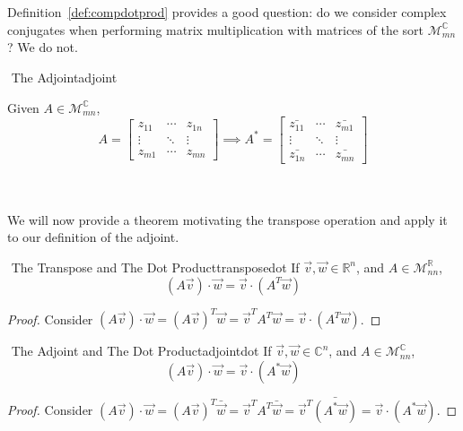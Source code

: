         \vphantom
        \\
        \\
        Definition~\ref{def:compdotprod} provides a good question: do we consider complex conjugates when performing matrix multiplication with matrices of the sort \(\mathcal{M}_{mn}^\mathbb{C}\)? We do not.
        \begin{definition}{\Stop\,\,The Adjoint}{adjoint}

            Given \(A\in\mathcal{M}_{mn}^\mathbb{C}\), 
            \begin{equation*}
                A=\begin{bmatrix}
                    z_{11} & \cdots & z_{1n} \\
                    \vdots & \ddots & \vdots \\
                    z_{m1} & \cdots & z_{mn}
                \end{bmatrix}
                \implies 
                A^*=\begin{bmatrix}
                    \bar{z_{11}} & \cdots & \bar{z_{m1}} \\
                    \vdots & \ddots & \vdots \\
                    \bar{z_{1n}} & \cdots & \bar{z_{mn}}
                \end{bmatrix}
            \end{equation*}

        \end{definition}
        \pagebreak
        \vphantom
        \\
        \\
        We will now provide a theorem motivating the transpose operation and apply it to our definition of the adjoint.
        \begin{theorem}{\Stop\,\,The Transpose and The Dot Product}{transposedot}
            If \(\vec{v},\vec{w}\in\mathbb{R}^n\), and \(A\in\mathcal{M}_{nn}^\mathbb{R}\), 
            \begin{equation*}
                (A\vec{v})\cdot\vec{w}=\vec{v}\cdot(A^T\vec{w})
            \end{equation*}
            \begin{proof}
                Consider \((A\vec{v})\cdot\vec{w}=(A\vec{v})^T\vec{w}=\vec{v}^T A^T\vec{w}=\vec{v}\cdot (A^T\vec{w})\).
            \end{proof}
        \end{theorem}
        \begin{theorem}{\Stop\,\,The Adjoint and The Dot Product}{adjointdot}
            If \(\vec{v},\vec{w}\in\mathbb{C}^n\), and \(A\in\mathcal{M}_{nn}^\mathbb{C}\), 
            \begin{equation*}
                (A\vec{v})\cdot\vec{w}=\vec{v}\cdot(A^*\vec{w})
            \end{equation*}
            \begin{proof}
                Consider \((A\vec{v})\cdot\vec{w}=(A\vec{v})^T\bar{\vec{w}}=\vec{v}^TA^T\bar{\vec{w}}=\vec{v}^T\bar{(A^*\vec{w})}=\vec{v}\cdot(A^*\vec{w})\).
            \end{proof}
        \end{theorem}
